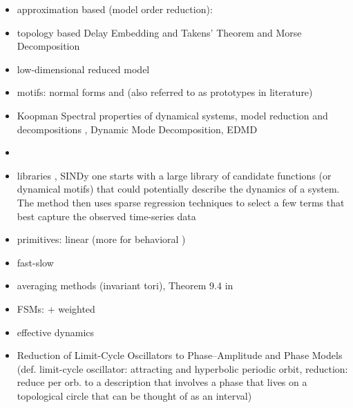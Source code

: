 \documentclass{article}
\theoremstyle{definition} \newtheorem{definition}{Definition}  \newtheorem{example}{Example}
\theoremstyle{remark} \newtheorem{remark}{Remark}
\newcounter{ct}
\begin{document}
\begin{itemize}
\item approximation based (model order reduction): \citep{schilders2008model}
\item topology based Delay Embedding and Takens' Theorem  and Morse Decomposition 
\item low-dimensional reduced model \citep{zemlianova2024dynamical} \citep{nonnenmacher2017extracting}
\item motifs: normal forms \citep{full1999templates} \citep{nayfeh2011normalforms} and \citep{bonilla2012discriminative} (also referred to as prototypes in literature)
\item Koopman  Spectral properties of dynamical systems, model reduction and decompositions \citep{mezic2005spectral}, Dynamic Mode Decomposition\citep{rowley2009spectral}, EDMD \citep{mezic2005spectral}
\item \citep{rowley2017model}
\item libraries \citep{brunton2014compressive}, SINDy  one starts with a large library of candidate functions (or dynamical motifs) that could potentially describe the dynamics of a system. The method then uses sparse regression techniques to select a few terms that best capture the observed time-series data \citep{brunton2016discovering, brunton2016sparse, fasel2022ensemble}
\item  primitives: linear \citep{kaul2020linear} (more for behavioral \citep{ijspeert2013dynamical})
\item fast-slow \citep{jones1995gspt} \citep{verhulst2006methods}  \citep{dsilva2016data} \citep{haller2017exact}
\item averaging methods \citep{sanders2007averaging} (invariant tori\citep{novaes2024invariant}), Theorem 9.4 in \citep{hoppensteadt2012weakly}
\item FSMs: \citep{giles1991extracting, casey1996dynamics, giles1999equivalence, oliva2019fsm, ceni2020excitable, cotteret2024fsm, aichernig2024learning} + weighted\citep{wei2024weighted}
\item effective dynamics \citep{menier2025interpretable}
\item Reduction of Limit-Cycle Oscillators to Phase–Amplitude and Phase Models \citep{ashwin2016mathematical} (def. limit-cycle oscillator: attracting and hyperbolic periodic orbit, reduction: reduce per orb. to a description that involves a phase that lives on a topological circle that can be thought of as an interval)

\end{itemize}
\end{document}
